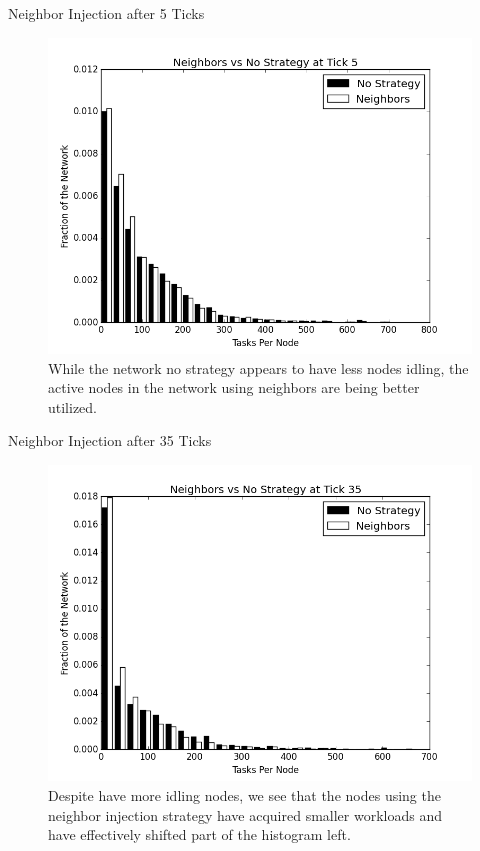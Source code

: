 \documentclass[11pt]{beamer}
\begin{document}
\begin{frame}{Neighbor Injection after 5 Ticks}
\begin{figure}
	\centering
	\includegraphics[width=0.7\linewidth]{figs/neighborsStableHist5}
	\caption[Neighbor injection vs no strategy after 5 ticks.]{While the network no strategy appears to have less nodes idling, the active nodes in the network using neighbors are being better utilized.}
	\label{fig:neighborsStableHist5}
\end{figure}


\end{frame}



\begin{frame}{Neighbor Injection after 35 Ticks}
\begin{figure}
	\centering
	\includegraphics[width=0.7\linewidth]{figs/neighborsStableHist35}
	\caption[Neighbor injection  vs no strategy after 35 ticks.]{Despite have more idling nodes, we see that the nodes using the neighbor injection strategy have acquired smaller workloads and have effectively shifted part of the histogram left.}
	\label{fig:neighborsStableHist35}
\end{figure}

\end{frame}
\end{document}

